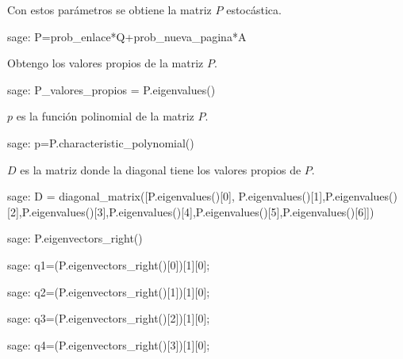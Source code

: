\par Con estos parámetros se obtiene la matriz $P$ estocástica.
\begin{sagecommandline}
    sage: P=prob_enlace*Q+prob_nueva_pagina*A
\end{sagecommandline}

\par Obtengo los valores propios de la matriz $P$.
\begin{sagecommandline}
    sage: P_valores_propios = P.eigenvalues()
\end{sagecommandline}
\par $p$ es la función polinomial de la matriz $P$.
\begin{sagecommandline}
    sage: p=P.characteristic_polynomial()
\end{sagecommandline}
\par $D$ es la matriz donde la diagonal tiene los valores propios de $P$.
\begin{sagecommandline}
    sage: D = diagonal_matrix([P.eigenvalues()[0], P.eigenvalues()[1],P.eigenvalues()[2],P.eigenvalues()[3],P.eigenvalues()[4],P.eigenvalues()[5],P.eigenvalues()[6]])
\end{sagecommandline}


\begin{sagecommandline}[\textwidth]
    sage: P.eigenvectors_right()
\end{sagecommandline}
    
\begin{sagecommandline}
    sage: q1=(P.eigenvectors_right()[0])[1][0];
\end{sagecommandline}

\begin{sagecommandline}
    sage: q2=(P.eigenvectors_right()[1])[1][0];
\end{sagecommandline}

\begin{sagecommandline}
    sage: q3=(P.eigenvectors_right()[2])[1][0];
\end{sagecommandline}

\begin{sagecommandline}
    sage: q4=(P.eigenvectors_right()[3])[1][0];
\end{sagecommandline}

